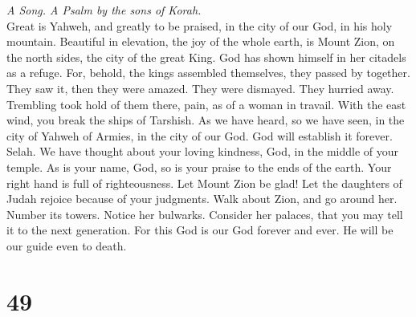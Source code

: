 \emph{A Song. A Psalm by the sons of Korah.}\\
 Great is Yahweh, and greatly to be praised, in the city
of our God, in his holy mountain.  Beautiful in elevation,
the joy of the whole earth, is Mount Zion, on the north sides, the city
of the great King.  God has shown himself in her citadels
as a refuge.  For, behold, the kings assembled themselves,
they passed by together.  They saw it, then they were
amazed. They were dismayed. They hurried away.  Trembling
took hold of them there, pain, as of a woman in travail. 
With the east wind, you break the ships of Tarshish.  As
we have heard, so we have seen, in the city of Yahweh of Armies, in the
city of our God. God will establish it forever. Selah.  We
have thought about your loving kindness, God, in the middle of your
temple.  As is your name, God, so is your praise to the
ends of the earth. Your right hand is full of righteousness.
 Let Mount Zion be glad! Let the daughters of Judah
rejoice because of your judgments.  Walk about Zion, and
go around her. Number its towers.  Notice her bulwarks.
Consider her palaces, that you may tell it to the next generation.
 For this God is our God forever and ever. He will be our
guide even to death.

\hypertarget{section-48}{%
\section{49}\label{section-48}}

